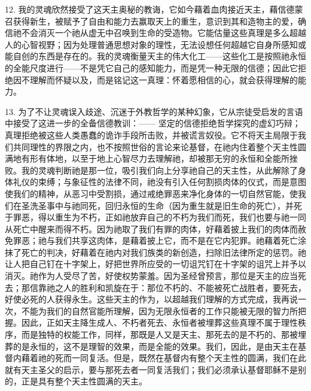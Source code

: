 12. 我的灵魂欣然接受了这天主奥秘的教诲，它如今藉着血肉接近天主，藉信德蒙召获得新生，被赋予了自由和能力去赢取天上的重生，意识到其和造物主的爱，确信祂不会消灭一个祂从虚无中召唤到生命的受造物。它能估量这些真理是多么超越人的心智视野；因为处理普通思想对象的理性，无法设想任何超越它自身所感知或能自创的东西是存在的。我的灵魂衡量天主的伟大化工——这些化工是按照祂永恒的全能尺度进行——不是凭它自己的感知能力，而是凭一种无限的信德；因此它拒绝因不理解而怀疑以及，而是铭记这一真理：怀着愿相信的心，就会获得理解的能力。\par

13. 为了不让灵魂误入歧途、沉迷于外教哲学的某种幻象，它从宗徒受启发的言语中接受了这进一步的全备信德教训：——   坚定的信德拒绝哲学探究的虚幻巧辩；真理拒绝被这些人类愚蠢的诡诈手段所击败，并被谎言奴役。它不将天主局限于我们共同理性的界限之内，也不按照世俗的言论来论基督，在祂内住着整个天主性圆满地有形有体地，以至于地上心智尽力去理解祂，却被那无穷的永恒和全能所挫败。我的灵魂判断祂是那一位，吸引我们向上分享祂自己的天主性，从此解除了身体礼仪的束缚；与象征性的法律不同，祂没有引入任何割损肉体的仪式，而是意图使我们的精神，从恶习中受割损，通过戒绝罪恶来净化身体的一切自然官能，使我们在圣洗圣事中与祂同死，回归永恒的生命（因为重生就是旧生命的死亡），并死于罪恶，得以重生为不朽，正如祂放弃自己的不朽为我们而死，我们也要与祂一同从死亡中醒来而得不朽。因为祂取了我们有罪的肉体，好藉着披上我们的肉体而赦免罪恶；祂与我们共享这肉体，是藉着披上它，而不是在它内犯罪。祂藉着死亡涂抹了死亡的判决，好藉着在祂内对我们族类的新创造，扫除旧法律所定的惩罚。祂让人把自己钉在十字架上，好把世界所应受的一切诅咒钉在十字架的诅咒上并予以消灭。祂作为人受尽了苦，好使权势蒙羞。因为圣经曾预言，那位是天主的应当死去；那信靠祂之人的胜利和凯旋在于：那位不朽的、不能被死亡战胜者，要死去，好使必死的人获得永生。这些天主的作为，以超越我们理解的方式完成，我再说一次，不能为我们的自然官能所理解，因为无限永恒者的工作只能被无限的智力所把握。因此，正如天主降生成人、不朽者死去、永恒者被埋葬这些真理不属于理性秩序，而是独特的权能工作，同样，那既是人又是天主、那死去的是不朽的、那被埋葬的是永恒的，这不是理智的效果，而是全能的效果。我们，因此，是由天主在基督内藉着祂的死而一同复活。但是，既然在基督内有整个天主性的圆满，我们在此就有天主圣父的启示，要与那死去者一同复活我们；我们必须承认基督耶稣不是别的，正是具有整个天主性圆满的天主。\par

